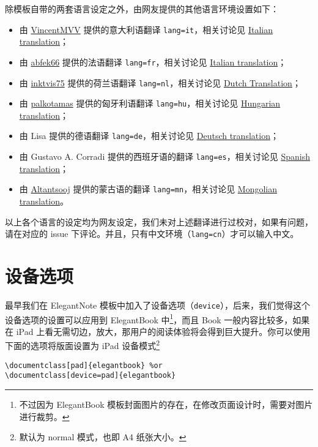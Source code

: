 \documentclass[cn,10pt,math=newtx,citestyle=gb7714-2015,bibstyle=gb7714-2015]{elegantbook}
\begin{document}
除模板自带的两套语言设定之外，由网友提供的其他语言环境设置如下：
\begin{itemize}
  \item 由 \href{https://github.com/VincentMVV}{VincentMVV} 提供的意大利语翻译 \lstinline{lang=it}，相关讨论见 \href{https://github.com/ElegantLaTeX/ElegantBook/issues/85}{Italian translation}；
  \item 由 \href{https://github.com/abfek66}{abfek66} 提供的法语翻译 \lstinline{lang=fr}，相关讨论见 \href{https://github.com/ElegantLaTeX/ElegantBook/issues/85}{Italian translation}；
  \item 由 \href{https://github.com/inktvis75}{inktvis75} 提供的荷兰语翻译 \lstinline{lang=nl}，相关讨论见 \href{https://github.com/ElegantLaTeX/ElegantBook/issues/108}{Dutch Translation}；
  \item 由 \href{https://github.com/palkotamas}{palkotamas} 提供的匈牙利语翻译 \lstinline{lang=hu}，相关讨论见 \href{https://github.com/ElegantLaTeX/ElegantBook/issues/111}{Hungarian translation}；
  \item 由 Lisa 提供的德语翻译 \lstinline{lang=de}，相关讨论见 \href{https://github.com/ElegantLaTeX/ElegantBook/issues/113}{Deutsch translation}；
  \item 由 Gustavo A. Corradi 提供的西班牙语的翻译 \lstinline{lang=es}，相关讨论见 \href{https://github.com/ElegantLaTeX/ElegantBook/issues/133}{Spanish translation}；
  \item 由 \href{https://github.com/Altantsooj}{Altantsooj} 提供的蒙古语的翻译 \lstinline{lang=mn}，相关讨论见 \href{https://github.com/ElegantLaTeX/ElegantBook/issues/137}{Mongolian translation}。
\end{itemize}



\begin{remark}
以上各个语言的设定均为网友设定，我们未对上述翻译进行过校对，如果有问题，请在对应的 issue 下评论。并且，只有中文环境（\lstinline{lang=cn}）才可以输入中文。
\end{remark}

\section{设备选项}
最早我们在 ElegantNote 模板中加入了设备选项（\lstinline{device}），后来，我们觉得这个设备选项的设置可以应用到 ElegantBook 中\footnote{不过因为 ElegantBook 模板封面图片的存在，在修改页面设计时，需要对图片进行裁剪。}，而且 Book 一般内容比较多，如果在 iPad 上看无需切边，放大，那用户的阅读体验将会得到巨大提升。你可以使用下面的选项将版面设置为 iPad 设备模式\footnote{默认为 normal 模式，也即 A4 纸张大小。}
\begin{lstlisting}
\documentclass[pad]{elegantbook} %or
\documentclass[device=pad]{elegantbook}
\end{lstlisting}
\end{document}
